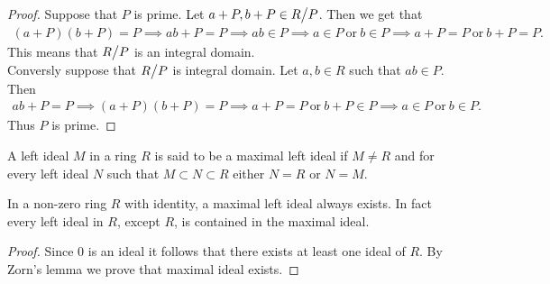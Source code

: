 \begin{proof}
  Suppose that $P$ is prime. Let $a+P, b+P\in R\bign/P$. Then we get that
  \begin{align*}
    (a+P) (b+P) = P \implies ab + P = P \implies ab\in P \implies a\in P\ \text{or}\ b\in P \implies a+P = P\ \text{or}\ b+P = P.
  \end{align*}
  This means that $R\bign/P$ is an integral domain.\\

  Conversly suppose that $R\bign/P$ is integral domain. Let $a,b\in R$ such that $ab\in P$. Then
  \begin{align*}
    ab + P = P \implies (a+P)(b+P) = P \implies a+P = P\ \text{or}\ b+P\in P\implies a\in P\ \text{or}\ b\in P.
  \end{align*}
  Thus $P$ is prime.
\end{proof}
\begin{definition}
  A left ideal $M$ in a ring $R$ is said to be a maximal left ideal if $M\neq R$ and for every left ideal $N$ such that $M\subset N \subset R$ either $N=R$ or $N=M$. 
\end{definition}
\begin{theorem}
  In a non-zero ring $R$ with identity, a maximal left ideal always exists. In fact every left ideal in $R$, except $R$, is contained in the maximal ideal.
\end{theorem}
\begin{proof}
  Since $0$ is an ideal it follows that there exists at least one ideal of $R$. By Zorn's lemma we prove that maximal ideal exists.
\end{proof}
